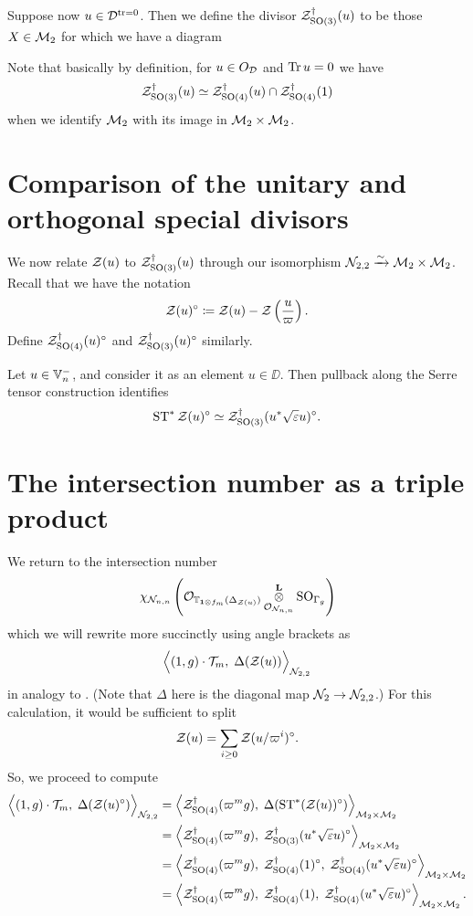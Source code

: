 \begin{definition}
  Suppose now $u \in \mathcal D^{\operatorname{tr} = 0}$.
  Then we define the divisor $\mathcal Z^{\dagger}_{\operatorname{SO}(3)}(u)$ to be those $X \in \mathcal M_2$
  for which we have a diagram
  \begin{center}
  \end{center}
  Note that basically by definition, for $u \in O_\mathcal D$ and $\operatorname{Tr} u = 0$ we have
  \[ \mathcal Z^{\dagger}_{\operatorname{SO}(3)}(u) \simeq \mathcal Z^{\dagger}_{\operatorname{SO}(4)}(u) \cap \mathcal Z^{\dagger}_{\operatorname{SO}(4)}(1) \]
  when we identify $\mathcal M_2$ with its image in $\mathcal M_2 \times \mathcal M_2$.
\end{definition}

\section{Comparison of the unitary and orthogonal special divisors}
We now relate $\mathcal Z(u)$ to $\mathcal Z^{\dagger}_{\operatorname{SO}(3)}(u)$ through our
isomorphism $\mathcal N_{2,2} \xrightarrow{\sim} \mathcal M_2 \times \mathcal M_2$.
Recall that we have the notation
\[ \mathcal Z(u)^\circ \coloneqq \mathcal Z(u) - \mathcal Z\left( \frac{u}{\varpi} \right). \]
Define $\mathcal Z^{\dagger}_{\operatorname{SO}(4)}(u)^\circ$ and $\mathcal Z^{\dagger}_{\operatorname{SO}(3)}(u)^\circ$ similarly.

\begin{conjecture}
  Let $u \in \mathbb V_n^-$, and consider it as an element $u \in \DD$.
  Then pullback along the Serre tensor construction identifies
  \[ \operatorname{ST}^\ast \mathcal Z(u)^\circ \simeq \mathcal Z^{\dagger}_{\operatorname{SO}(3)}(u^\ast \sqrt{\varepsilon} u)^\circ. \]
\end{conjecture}

\section{The intersection number as a triple product}
We return to the intersection number
\[ \chi_{\mathcal N_{n,n}} \left(
      \mathcal{O}_{\mathbb T_{\mathbf{1} \otimes f_m}(\Delta_{\mathcal Z(u)})}
      \mathop{\otimes}^{\mathbf{L}}_{\mathcal{O}_{\mathcal N_{n,n}}} \operatorname{SO}_{\Gamma_g} \right) \]
which we will rewrite more succinctly using angle brackets as
\[ \Big\langle (1,g) \cdot \mathcal{T}_m, \; \Delta(\mathcal Z(u)) \Big\rangle_{\mathcal N_{2,2}} \]
in analogy to \cite[\S6.1]{ref:AFLspherical}.
(Note that $\Delta$ here is the diagonal map $\mathcal N_2 \to \mathcal N_{2,2}$.)
For this calculation, it would be sufficient to split
\[ \mathcal Z(u) = \sum_{i \ge 0} \mathcal Z(u/\varpi^i)^\circ. \]
So, we proceed to compute
\begin{align*}
  \Big\langle (1,g) \cdot \mathcal{T}_m, \; \Delta(\mathcal Z(u)^\circ) \Big\rangle_{\mathcal N_{2,2}}
  &= \left< \mathcal Z^{\dagger}_{\operatorname{SO}(4)}(\varpi^m g), \; \Delta(\operatorname{ST}^\ast(\mathcal Z(u))^\circ) \right>_{\mathcal M_2 \times \mathcal M_2} \\
  &= \left< \mathcal Z^{\dagger}_{\operatorname{SO}(4)}(\varpi^m g), \; \mathcal Z^{\dagger}_{\operatorname{SO}(3)}(u^\ast \sqrt{\varepsilon} u)^\circ \right>_{\mathcal M_2 \times \mathcal M_2} \\
  &= \left< \mathcal Z^{\dagger}_{\operatorname{SO}(4)}(\varpi^m g), \; \mathcal Z^{\dagger}_{\operatorname{SO}(4)}(1)^\circ, \; \mathcal Z^{\dagger}_{\operatorname{SO}(4)}(u^\ast \sqrt{\varepsilon} u)^\circ \right>_{\mathcal M_2 \times \mathcal M_2} \\
  &= \left< \mathcal Z^{\dagger}_{\operatorname{SO}(4)}(\varpi^m g), \; \mathcal Z^{\dagger}_{\operatorname{SO}(4)}(1), \; \mathcal Z^{\dagger}_{\operatorname{SO}(4)}(u^\ast \sqrt{\varepsilon} u)^\circ \right>_{\mathcal M_2 \times \mathcal M_2}.
\end{align*}

